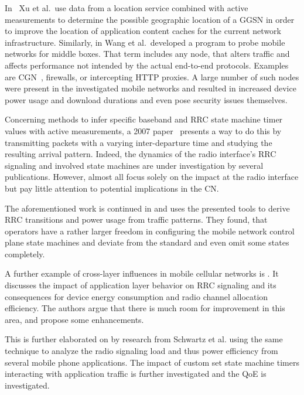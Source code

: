 In~\cite{Xu:2011:CDN:2007116.2007149} Xu et al.\ use data from a location service combined with active measurements to determine the possible geographic location of a \gls{GGSN} in order to improve the location of application content caches for the current network infrastructure. Similarly, in \cite{sigcomm11middleboxes} Wang et al.\ developed a program to probe mobile networks for middle boxes. That term includes any node, that alters traffic and affects performance not intended by the actual end-to-end protocols. Examples are \gls{CGN}~\cite{rfc7021}, firewalls, or intercepting \gls{HTTP} proxies. A large number of such nodes were present in the investigated mobile networks and resulted in increased device power usage and download durations and even pose security issues themselves.

Concerning methods to infer specific baseband and \gls{RRC} state machine timer values with active measurements, a 2007 paper~\cite{4640935} presents a way to do this by transmitting packets with a varying inter-departure time and studying the resulting arrival pattern. Indeed, the dynamics of the radio interface's \gls{RRC} signaling and involved state machines are under investigation by several publications. However, almost all focus solely on the impact at the radio interface but pay little attention to potential implications in the \gls{CN}.

The aforementioned work is continued in \cite{5360763} and uses the presented tools to derive \gls{RRC} transitions and power usage from traffic patterns. They found, that operators have a rather larger freedom in configuring the mobile network control plane state machines and deviate from the standard and even omit some states completely.

A further example of cross-layer influences in mobile cellular networks is \cite{qian2011profiling}. It discusses the impact of application layer behavior on \gls{RRC} signaling and its consequences for device energy consumption and radio channel allocation efficiency. The authors argue that there is much room for improvement in this area, and propose some enhancements.

This is further elaborated on by research from Schwartz et al.\cite{schwartz2013angrybirds} using the same technique to analyze the radio signaling load and thus power efficiency from several mobile phone applications. The impact of custom set state machine timers interacting with application traffic is further investigated and the \gls{QoE} is investigated.


